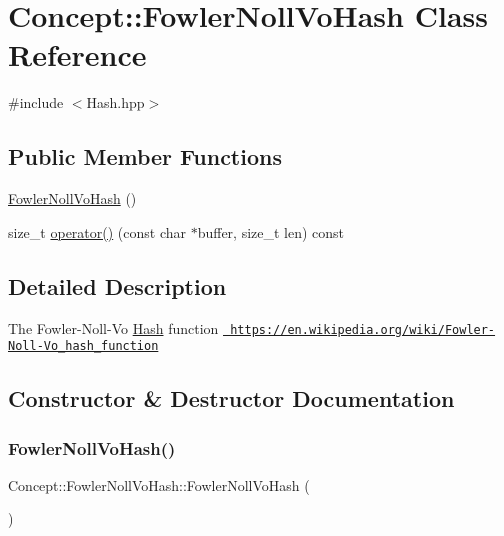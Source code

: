 \hypertarget{class_concept_1_1_fowler_noll_vo_hash}{}\section{Concept\+::Fowler\+Noll\+Vo\+Hash Class Reference}
\label{class_concept_1_1_fowler_noll_vo_hash}


{\ttfamily \#include $<$Hash.\+hpp$>$}

\subsection*{Public Member Functions}
\begin{DoxyCompactItemize}
\item 
\mbox{\hyperlink{class_concept_1_1_fowler_noll_vo_hash_a93501440ff8b6481a0b4a47d5954384f}{Fowler\+Noll\+Vo\+Hash}} ()
\item 
size\+\_\+t \mbox{\hyperlink{class_concept_1_1_fowler_noll_vo_hash_a84663d745717952aa7a677a5a7c557c1}{operator()}} (const char $\ast$buffer, size\+\_\+t len) const
\end{DoxyCompactItemize}


\subsection{Detailed Description}
The Fowler-\/\+Noll-\/\+Vo \mbox{\hyperlink{class_concept_1_1_hash}{Hash}} function \href{https://en.wikipedia.org/wiki/Fowler-Noll-Vo_hash_function}{\texttt{ https\+://en.\+wikipedia.\+org/wiki/\+Fowler-\/\+Noll-\/\+Vo\+\_\+hash\+\_\+function}} 

\subsection{Constructor \& Destructor Documentation}
\mbox{\label{class_concept_1_1_fowler_noll_vo_hash_a93501440ff8b6481a0b4a47d5954384f}} 
\subsubsection{\texorpdfstring{FowlerNollVoHash()}{FowlerNollVoHash()}}
{\footnotesize\ttfamily Concept\+::\+Fowler\+Noll\+Vo\+Hash\+::\+Fowler\+Noll\+Vo\+Hash (\begin{DoxyParamCaption}{ }\end{DoxyParamCaption})\hspace{0.3cm}{\ttfamily [inline]}}

